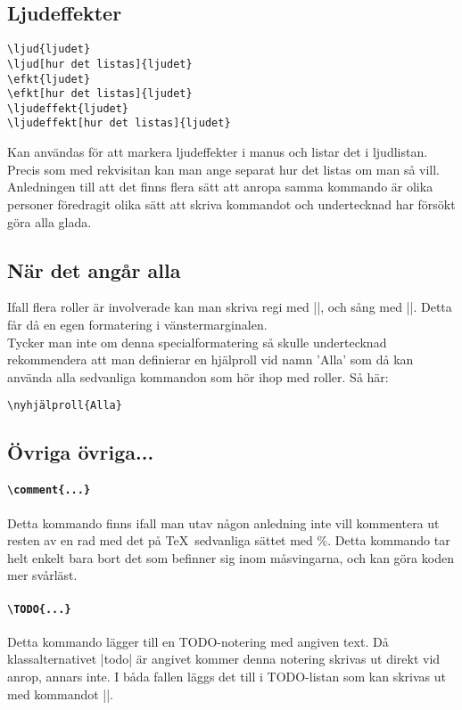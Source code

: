 \documentclass[a4paper,12pt]{article}
\begin{document}
\subsection{Ljudeffekter}
\begin{lstlisting}
\ljud{ljudet}
\ljud[hur det listas]{ljudet}
\efkt{ljudet}
\efkt[hur det listas]{ljudet}
\ljudeffekt{ljudet}
\ljudeffekt[hur det listas]{ljudet}
\end{lstlisting}
Kan användas för att markera ljudeffekter i manus och listar det i ljudlistan. Precis som med rekvisitan kan man ange separat hur det listas om man så vill. Anledningen till att det finns flera sätt att anropa samma kommando är olika personer föredragit olika sätt att skriva kommandot och undertecknad har försökt göra alla glada.


\subsection{När det angår alla}
Ifall flera roller är involverade kan man skriva regi med |\allgr{}|, och sång med |\allsj{}|.
Detta får då en egen formatering i vänstermarginalen. 
\\
Tycker man inte om denna specialformatering så skulle undertecknad rekommendera att man definierar en hjälproll vid namn 'Alla' som då kan använda alla sedvanliga kommandon som hör ihop med roller.
Så här:
\begin{lstlisting}
\nyhjälproll{Alla}
\end{lstlisting}


\subsection{Övriga övriga...}
\paragraph{\tt\bfseries\textbackslash comment\{...\}}
Detta kommando finns ifall man utav någon anledning inte vill kommentera ut resten av en rad med det på \TeX\ sedvanliga sättet med \%. Detta kommando tar helt enkelt bara bort det som befinner sig inom måsvingarna, och kan göra koden mer svårläst.

\paragraph{\tt\bfseries\textbackslash TODO\{...\}}
Detta kommando lägger till en TODO-notering med angiven text. Då klassalternativet |todo| är angivet kommer denna notering skrivas ut direkt vid anrop, annars inte. I båda fallen läggs det till i TODO-listan som kan skrivas ut med kommandot |\todolista|.
\end{document}

